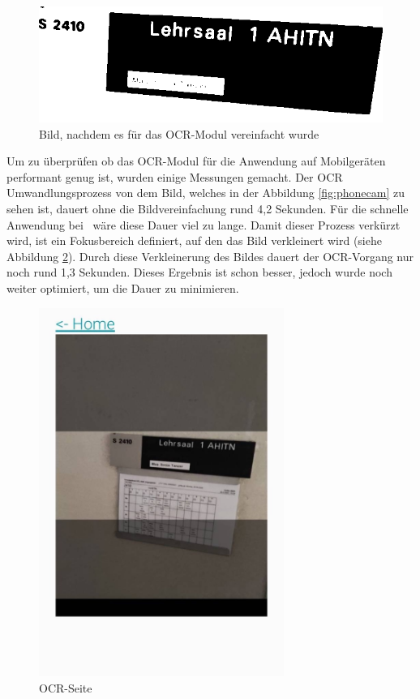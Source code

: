 \begin{figure}
    \centering
    \includegraphics[width=120mm]{media/OCR/compressed}
    \caption{Bild, nachdem es für das OCR-Modul vereinfacht wurde}
    \label{ocroptimised}
\end{figure}


\pagebreak

\label{sec:ocrmessung}

Um zu überprüfen ob das OCR-Modul für die Anwendung auf Mobilgeräten performant genug ist, wurden einige Messungen gemacht. Der OCR Umwandlungsprozess von dem Bild, welches in der Abbildung \ref{fig:phonecam} zu sehen ist, dauert ohne die Bildvereinfachung rund 4,2 Sekunden. Für die schnelle Anwendung bei \ZELIA\ wäre diese Dauer viel zu lange. Damit dieser Prozess verkürzt wird, ist ein Fokusbereich definiert, auf den das Bild verkleinert wird (siehe Abbildung \ref{fig:ocrfocus}). Durch diese Verkleinerung des Bildes dauert der OCR-Vorgang nur noch rund 1,3 Sekunden. Dieses Ergebnis ist schon besser, jedoch wurde noch weiter optimiert, um die Dauer zu minimieren. 

\begin{figure}[H]
    \centering
    \includegraphics[width=80mm]{media/WebComponents/OCRSeite_light.jpg}
    \caption{OCR-Seite}
    \label{fig:ocrfocus}
\end{figure}

